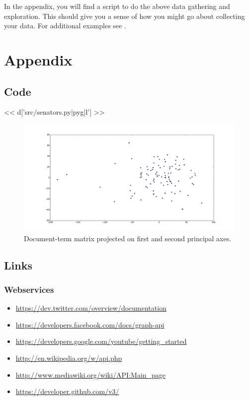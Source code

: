 In the appendix, you will find a script to do the above data gathering and
exploration. This should give you a sense of how you might go about collecting
your data.  For additional examples see \cite{russell2013mining}.

\newpage
\section*{Appendix}

\subsection*{Code}

<< d['src/senators.py|pyg|l'] >>

\begin{figure}[h]
\centering
  \includegraphics[width=0.9\linewidth]{fig/pca.png}
  \caption{Document-term matrix projected on first and second principal axes.}\label{fig:pca}
\end{figure}

\subsection*{Links}

\subsubsection*{Webservices} 
\begin{itemize}
\item \url{https://dev.twitter.com/overview/documentation}
\item \url{https://developers.facebook.com/docs/graph-api}
\item \url{https://developers.google.com/youtube/getting_started}
\item \url{http://en.wikipedia.org/w/api.php}
\item \url{http://www.mediawiki.org/wiki/API:Main_page}
\item \url{https://developer.github.com/v3/}
\end{itemize}


